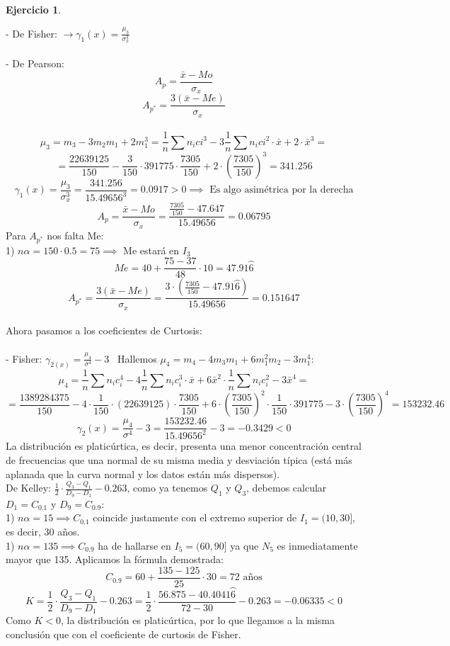 \documentclass[a4paper, 12pt]{article}
\theoremstyle{definition}
\newtheorem{ej}{Ejercicio}
\begin{document}
\begin{ej}
\begin{enumerate}[label=\textit{\alph*)}]
    - De Fisher: $\rightarrow  \gamma_{1}(x) = \frac{\mu_{3}}{\sigma_{x}^3}$ \\
    \\
    - De Pearson: 
    $$A_{p} = \frac{\bar{x}-Mo}{\sigma_{x}}$$
    $$A_{p^*} = \frac{3(\bar{x}-Me)}{\sigma_{x}}$$
    \\
    $$\mu_{3} = m_{3} - 3m_{2}m_{1} + 2m_{1}^3 = \frac{1}{n} \sum n_{i}c{i}^3 - 3\frac{1}{n}\sum n_{i}c{i}^2 \cdot \bar{x} + 2\cdot \bar{x}^3 =$$
    $$= \frac{22639125}{150} - \frac{3}{150} \cdot 391775 \cdot \frac{7305}{150} + 2 \cdot (\frac{7305}{150})^3 = 341.256$$
    $$\gamma_{1}(x) = \frac{\mu_{3}}{\sigma_{x}^3} = \frac{341.256}{15.49656^3}= 0.0917 > 0 \implies \text{ Es algo asimétrica por la derecha}$$
    $$A_{p} = \frac{\bar{x}-Mo}{\sigma_{x}} = \frac{\frac{7305}{150}-47.647}{15.49656} = 0.06795$$
    Para $A_{p^*}$ nos falta Me: \\
    1) $n\alpha = 150 \cdot 0.5 = 75 \implies$ Me estará en $I_{3}$ \\
    $$Me = 40 + \frac{75 - 37}{48}\cdot 10 = 47.91\wideparen{6}$$
    $$A_{p^*} = \frac{3(\bar{x}-Me)}{\sigma_{x}} = \frac{3\cdot(\frac{7305}{150}-47.91\wideparen{6})}{15.49656} = 0.151647$$
    \\
    Ahora pasamos a los coeficientes de Curtosis: \\
    \\
    - Fisher: $\gamma_{2(x)} = \frac{\mu_{4}}{\sigma^4}-3$ \ Hallemos $\mu_{4} = m_{4} - 4m_{3}m_{1}+6m_{1}^2m_{2}-3m_{1}^4$: \\
    $$\mu_{4}=\frac{1}{n}\sum n_{i}c_{i}^4-4\frac{1}{n} \sum n_{i}c_{i}^3\cdot \bar{x}+6\bar{x}^2\cdot\frac{1}{n} \sum n_{i}c_{i}^2 - 3\bar{x}^4 = $$
    $$= \frac{1389284375}{150}-4 \cdot\frac{1}{150}\cdot(22639125)\cdot\frac{7305}{150} + 6\cdot(\frac{7305}{150})^2\cdot\frac{1}{150}\cdot 391775 - 3\cdot (\frac{7305}{150})^4 =153232.46$$
    $$\gamma_{2}(x) = \frac{\mu_{4}}{\sigma^4} - 3=\frac{153232.46}{15.49656^2} - 3 = -0.3429 < 0$$
    La distribución es platicúrtica, es decir, presenta una menor concentración central de frecuencias que una normal de su misma media y desviación típica (está más aplanada que la curva normal y los datos están más dispersos). \\
    De Kelley: $\frac{1}{2} \cdot \frac{Q_{3}-Q_{1}}{D_{9}-D_{1}} - 0.263$, como ya tenemos $Q_{1}$ y $Q_{3}$, debemos calcular $D_{1} =  C_{0.1}$ y $D_{9} = C_{0.9}$: \\
    1) $n\alpha = 15 \implies C_{0.1}$ coincide justamente con el extremo superior de $I_{1} = (10,30]$, es decir, 30 años. \\
    1) $n\alpha = 135 \implies C_{0.9}$ ha de hallarse en $I_{5} = (60,90]$ ya que $N_{5}$ es inmediatamente mayor que 135. Aplicamos la fórmula demostrada: \\
    $$C_{0.9} = 60 + \frac{135 -125}{25}\cdot30 = 72 \text{ años}$$
    $$K = \frac{1}{2} \cdot \frac{Q_{3}-Q_{1}}{D_{9}-D_{1}} - 0.263 = \frac{1}{2} \cdot \frac{56.875-40.4041\wideparen{6}}{72-30} - 0.263 = -0.06335 < 0$$
    Como $K<0$, la distribución es platicúrtica, por lo que llegamos a la misma conclusión que con el coeficiente de curtosis de Fisher.
\end{enumerate}
\end{ej}
\end{document}

